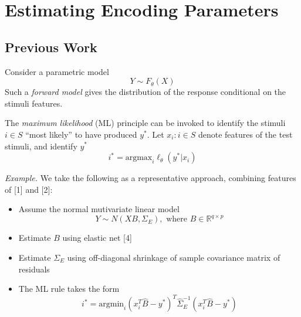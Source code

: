\documentclass[12pt]{article}
\begin{document}


\section{Estimating Encoding Parameters}

\subsection{Previous Work}

Consider a parametric model
\[
Y \sim F_\theta(X)
\]
Such a \emph{forward model} gives the distribution of the
response conditional on the stimuli features.

The \emph{maximum likelihood} (ML) principle can be invoked to
identify the stimuli $i \in S$ ``most likely'' to have produced $y^*$.
Let $x_i : i \in S$ denote features of the test stimuli, and
identify $y^*$
\[
i^* = \text{argmax}_i \ell_\theta(y^*| x_i)
\]

\emph{Example.} We take the following as a representative approach, combining features of [1] and [2]:
\begin{itemize}
\item Assume the normal mutivariate linear model
\[Y \sim N( XB , \Sigma_E), \text{ where }B \in \mathbb{R}^{q \times p}\]
\item Estimate $B$ using elastic net [4]
\item Estimate $\Sigma_E$ using off-diagonal shrinkage of sample covariance matrix of residuals
\item The ML rule takes the form
\begin{equation}\label{mlrule}
i^* = \text{argmin}_{i} (x_i^T \hat{B} - y^*)^T \hat{\Sigma}_E^{-1} (x_i^T \hat{B} - y^*)
\end{equation}
\end{itemize}
\end{document}
